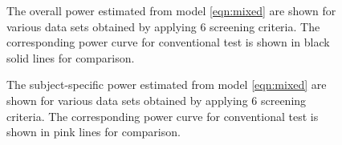 \documentclass{article}
\begin{document}
\begin{figure}[hbtp]
   \centering
       \caption{The overall power estimated from model \ref{eqn:mixed} are shown for various data sets obtained by applying 6 screening criteria.  The corresponding power curve for conventional test is shown in black solid lines for comparison.}
       \label{fig:power_screening}
\end{figure}

\begin{figure}[hbtp]
   \centering
      \caption{The subject-specific power estimated from model \ref{eqn:mixed} are shown for various data sets obtained by applying 6 screening criteria.  The corresponding power curve for conventional test is shown in pink lines for comparison.}
       \label{fig:power_screening_subject}	
\end{figure}
\end{document}
